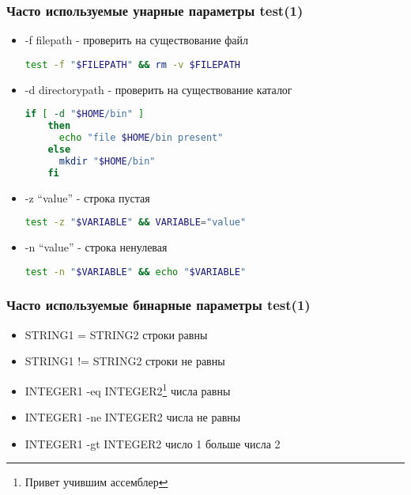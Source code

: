 \begin{frame}[fragile]
  \frametitle{Часто используемые унарные параметры test(1)}
  \begin{itemize}
    \item \alert{-f filepath} - проверить на существование файл
      \begin{lstlisting}[language=sh,frame=single,basicstyle=\normalsize,breaklines=true]
	test -f "$FILEPATH" && rm -v $FILEPATH
      \end{lstlisting} \pause
    \item \alert{-d directorypath} - проверить на существование каталог
      \begin{lstlisting}[language=sh,frame=single,basicstyle=\tiny,breaklines=true]
	if [ -d "$HOME/bin" ]
	then 
	  echo "file $HOME/bin present"
	else
	  mkdir "$HOME/bin"
	fi
      \end{lstlisting} \pause
    \item \alert{-z ``value''} - строка пустая
      \begin{lstlisting}[language=sh,frame=single,basicstyle=\normalsize,breaklines=true]
	test -z "$VARIABLE" && VARIABLE="value"
      \end{lstlisting} \pause
    \item \alert{-n ``value''} - строка ненулевая
      \begin{lstlisting}[language=sh,frame=single,basicstyle=\normalsize,breaklines=true]
	test -n "$VARIABLE" && echo "$VARIABLE"
      \end{lstlisting} 
  \end{itemize}

\end{frame}

\begin{frame}[fragile]
  \frametitle{Часто используемые бинарные параметры test(1)}
  \begin{itemize}
    \item \alert{STRING1 = STRING2} строки равны
    \item \alert{STRING1 != STRING2} строки не равны
    \item \alert{INTEGER1 -eq INTEGER2}\footnote{Привет учившим ассемблер} числа равны
    \item \alert{INTEGER1 -ne INTEGER2} числа не равны
    \item \alert{INTEGER1 -gt INTEGER2} число 1 больше числа 2
  \end{itemize}
\end{frame}

